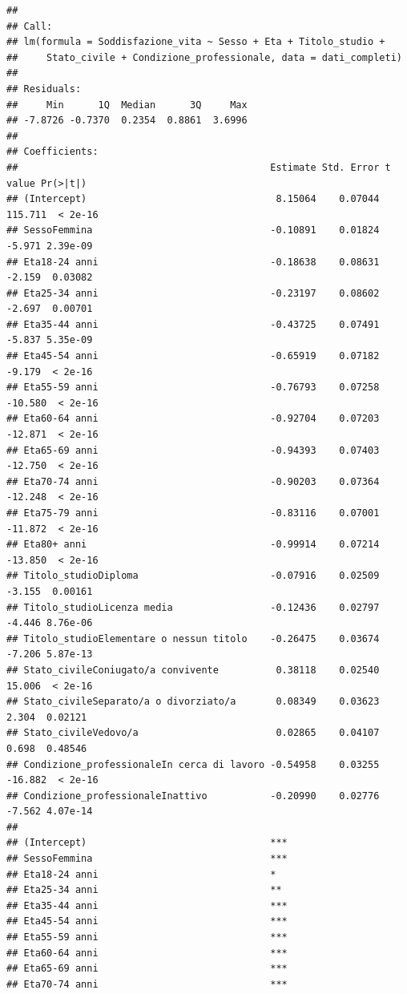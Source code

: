 \documentclass[
]{article}
\begin{document}
\begin{verbatim}
## 
## Call:
## lm(formula = Soddisfazione_vita ~ Sesso + Eta + Titolo_studio + 
##     Stato_civile + Condizione_professionale, data = dati_completi)
## 
## Residuals:
##     Min      1Q  Median      3Q     Max 
## -7.8726 -0.7370  0.2354  0.8861  3.6996 
## 
## Coefficients:
##                                            Estimate Std. Error t value Pr(>|t|)
## (Intercept)                                 8.15064    0.07044 115.711  < 2e-16
## SessoFemmina                               -0.10891    0.01824  -5.971 2.39e-09
## Eta18-24 anni                              -0.18638    0.08631  -2.159  0.03082
## Eta25-34 anni                              -0.23197    0.08602  -2.697  0.00701
## Eta35-44 anni                              -0.43725    0.07491  -5.837 5.35e-09
## Eta45-54 anni                              -0.65919    0.07182  -9.179  < 2e-16
## Eta55-59 anni                              -0.76793    0.07258 -10.580  < 2e-16
## Eta60-64 anni                              -0.92704    0.07203 -12.871  < 2e-16
## Eta65-69 anni                              -0.94393    0.07403 -12.750  < 2e-16
## Eta70-74 anni                              -0.90203    0.07364 -12.248  < 2e-16
## Eta75-79 anni                              -0.83116    0.07001 -11.872  < 2e-16
## Eta80+ anni                                -0.99914    0.07214 -13.850  < 2e-16
## Titolo_studioDiploma                       -0.07916    0.02509  -3.155  0.00161
## Titolo_studioLicenza media                 -0.12436    0.02797  -4.446 8.76e-06
## Titolo_studioElementare o nessun titolo    -0.26475    0.03674  -7.206 5.87e-13
## Stato_civileConiugato/a convivente          0.38118    0.02540  15.006  < 2e-16
## Stato_civileSeparato/a o divorziato/a       0.08349    0.03623   2.304  0.02121
## Stato_civileVedovo/a                        0.02865    0.04107   0.698  0.48546
## Condizione_professionaleIn cerca di lavoro -0.54958    0.03255 -16.882  < 2e-16
## Condizione_professionaleInattivo           -0.20990    0.02776  -7.562 4.07e-14
##                                               
## (Intercept)                                ***
## SessoFemmina                               ***
## Eta18-24 anni                              *  
## Eta25-34 anni                              ** 
## Eta35-44 anni                              ***
## Eta45-54 anni                              ***
## Eta55-59 anni                              ***
## Eta60-64 anni                              ***
## Eta65-69 anni                              ***
## Eta70-74 anni                              ***

\end{verbatim}
\end{document}
